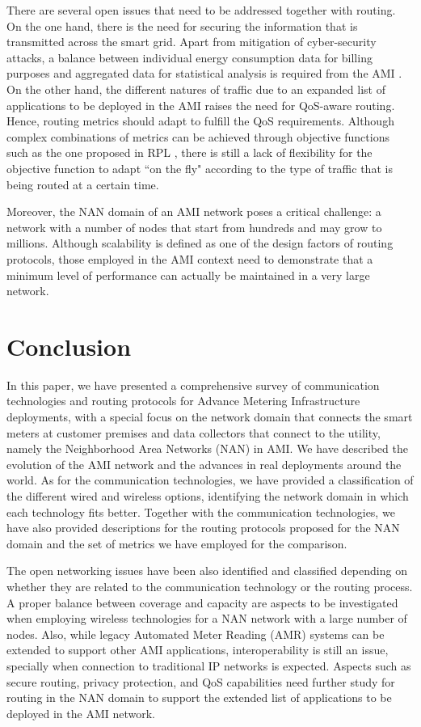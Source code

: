 \documentclass[11pt,draftclsnofoot,onecolumn]{IEEEtran}
\begin{document}
There are several open issues that need to be addressed together with routing. On the one hand, there is the need for securing the information that is transmitted across the smart grid. Apart from mitigation of cyber-security attacks, a balance between individual energy consumption data for billing purposes and aggregated data for statistical analysis is required from the AMI \cite{Saputro2012}. On the other hand, the different natures of traffic due to an expanded list of applications to be deployed in the AMI raises the need for QoS-aware routing. Hence, routing metrics should adapt to fulfill the QoS requirements. Although complex combinations of metrics can be achieved through objective functions such as the one proposed in RPL  \cite{Dohler2009}, there is still a lack of flexibility for the objective function to adapt ``on the fly" according to the type of traffic that is being routed at a certain time. 

Moreover, the NAN domain of an AMI network poses a critical challenge: a network with a number of nodes that start from hundreds and may grow to millions. Although scalability is defined as one of the design factors of routing protocols, those employed in the AMI context need to demonstrate that a minimum level of performance can actually be maintained in a very large network.


\section{Conclusion}\label{conclusion}

In this paper, we have presented a comprehensive survey of communication technologies and routing protocols for Advance Metering Infrastructure deployments, with a special focus on the network domain that connects the smart meters at customer premises and data collectors that connect to the utility, namely the Neighborhood Area Networks (NAN) in AMI. We have described the evolution of the AMI network and the advances in real deployments around the world. As for the communication technologies, we have provided a classification of the different wired and wireless options, identifying the network domain in which each technology fits better. Together with the communication technologies, we have also provided descriptions for the routing protocols proposed for the NAN domain and the set of metrics we have employed for the comparison. 

The open networking issues have been also identified and classified depending on whether they are related to the communication technology or the routing process. A proper balance between coverage and capacity are aspects to be investigated when employing wireless technologies for a NAN network with a large number of nodes. Also, while legacy Automated Meter Reading (AMR) systems can be extended to support other AMI applications, interoperability is still an issue, specially when connection to traditional IP networks is expected. Aspects such as secure routing, privacy protection, and QoS capabilities need further study for routing in the NAN domain to support the extended list of applications to be deployed in the AMI network. 
\end{document}
